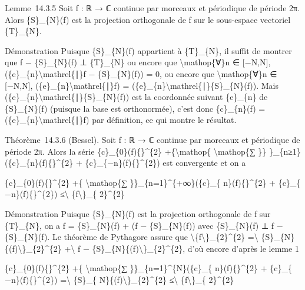 \documentclass[]{article}
\begin{document}
Lemme~14.3.5 Soit f : ℝ → ℂ continue par morceaux et périodique de
période 2π. Alors \{S\}\_\{N\}(f) est la projection orthogonale de f sur
le sous-espace vectoriel \{T\}\_\{N\}.

Démonstration Puisque \{S\}\_\{N\}(f) appartient à \{T\}\_\{N\}, il
suffit de montrer que f − \{S\}\_\{N\}(f) ⊥ \{T\}\_\{N\} ou encore que
\textbackslash{}mathop\{∀\}n ∈ {[}−N,N{]},
(\{e\}\_\{n\}\textbackslash{}mathrel\{∣\}f − \{S\}\_\{N\}(f)) = 0, ou
encore que \textbackslash{}mathop\{∀\}n ∈ {[}−N,N{]},
(\{e\}\_\{n\}\textbackslash{}mathrel\{∣\}f) =
(\{e\}\_\{n\}\textbackslash{}mathrel\{∣\}\{S\}\_\{N\}(f)). Mais
(\{e\}\_\{n\}\textbackslash{}mathrel\{∣\}\{S\}\_\{N\}(f)) est la
coordonnée suivant \{e\}\_\{n\} de \{S\}\_\{N\}(f) (puisque la base est
orthonormée), c'est donc \{c\}\_\{n\}(f) =
(\{e\}\_\{n\}\textbackslash{}mathrel\{∣\}f) par définition, ce qui
montre le résultat.

Théorème~14.3.6 (Bessel). Soit f : ℝ → ℂ continue par morceaux et
périodique de période 2π. Alors la série
\textbar{}\{c\}\_\{0\}(f)\{\textbar{}\}\^{}\{2\}
+\{\textbackslash{}mathop\{ \textbackslash{}mathop\{∑ \}\}
\}\_\{n≥1\}(\textbar{}\{c\}\_\{n\}(f)\{\textbar{}\}\^{}\{2\} +
\textbar{}\{c\}\_\{−n\}(f)\{\textbar{}\}\^{}\{2\}) est convergente et on
a

\textbar{}\{c\}\_\{0\}(f)\{\textbar{}\}\^{}\{2\} +\{
\textbackslash{}mathop\{∑ \}\}\_\{n=1\}\^{}\{+∞\}(\textbar{}\{c\}\_\{
n\}(f)\{\textbar{}\}\^{}\{2\} + \textbar{}\{c\}\_\{
−n\}(f)\{\textbar{}\}\^{}\{2\}) ≤\textbackslash{}\textbar{}
\{f\textbackslash{}\textbar{}\}\_\{ 2\}\^{}\{2\}

Démonstration Puisque \{S\}\_\{N\}(f) est la projection orthogonale de f
sur \{T\}\_\{N\}, on a f = \{S\}\_\{N\}(f) + (f − \{S\}\_\{N\}(f)) avec
\{S\}\_\{N\}(f) ⊥ f − \{S\}\_\{N\}(f). Le théorème de Pythagore assure
que
\textbackslash{}\textbar{}\{f\textbackslash{}\textbar{}\}\_\{2\}\^{}\{2\}
=\textbackslash{}\textbar{}
\{S\}\_\{N\}\{(f)\textbackslash{}\textbar{}\}\_\{2\}\^{}\{2\}
+\textbackslash{}\textbar{} f −
\{S\}\_\{N\}\{(f)\textbackslash{}\textbar{}\}\_\{2\}\^{}\{2\}, d'où
encore d'après le lemme 1

\textbar{}\{c\}\_\{0\}(f)\{\textbar{}\}\^{}\{2\} +\{
\textbackslash{}mathop\{∑ \}\}\_\{n=1\}\^{}\{N\}(\textbar{}\{c\}\_\{
n\}(f)\{\textbar{}\}\^{}\{2\} + \textbar{}\{c\}\_\{
−n\}(f)\{\textbar{}\}\^{}\{2\}) =\textbackslash{}\textbar{} \{S\}\_\{
N\}\{(f)\textbackslash{}\textbar{}\}\_\{2\}\^{}\{2\}
≤\textbackslash{}\textbar{} \{f\textbackslash{}\textbar{}\}\_\{
2\}\^{}\{2\}
\end{document}
